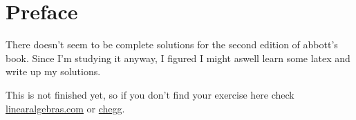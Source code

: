 \documentclass[titlepage,12pt]{book}
\begin{document}
\maketitle
\frontmatter

\chapter*{Preface}
There doesn't seem to be complete solutions for the second edition of abbott's book.
Since I'm studying it anyway, I figured I might aswell learn some latex and write up my solutions. \par
This is not finished yet, so if you don't find your exercise here check \href{https://linearalgebras.com/solution-understanding-analysis.html}{linearalgebras.com} or \href{https://www.chegg.com/homework-help/understanding-analysis-2nd-edition-solutions-9781493927111}{chegg}.

\tableofcontents
\mainmatter


\end{document}
